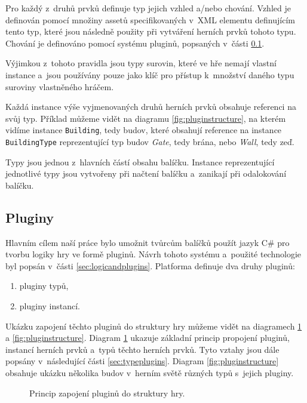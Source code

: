 Pro každý z~druhů prvků definuje typ jejich vzhled a/nebo chování. Vzhled je definován pomocí množiny assetů specifikovaných v~XML elementu definujícím tento typ, které jsou následně použity při vytváření herních prvků tohoto typu. Chování je definováno pomocí systému pluginů, popsaných v~části \ref{sec:plugins}. 

Výjimkou z~tohoto pravidla jsou typy surovin, které ve hře nemají vlastní instance a~jsou používány pouze jako klíč pro přístup k~množství daného typu suroviny vlastněného hráčem.

Každá instance výše vyjmenovaných druhů herních prvků obsahuje referenci na svůj typ. Příklad můžeme vidět na diagramu \ref{fig:pluginstructure}, na kterém vidíme instance \texttt{Building}, tedy budov, které obsahují reference na instance \texttt{BuildingType} reprezentující typ budov \textit{Gate}, tedy brána, nebo \textit{Wall}, tedy zeď.

Typy jsou jednou z~hlavních částí obsahu balíčku. Instance reprezentující jednotlivé typy jsou vytvořeny při načtení balíčku a~zanikají při odalokování balíčku. 

\subsection{Pluginy}
\label{sec:plugins}
Hlavním cílem naší práce bylo umožnit tvůrcům balíčků použít jazyk C\# pro tvorbu logiky hry ve formě pluginů. Návrh tohoto systému a~použité technologie byl popsán v~části \ref{sec:logicandplugins}. Platforma definuje dva druhy pluginů:

\begin{enumerate}
	\item pluginy typů,
	\item pluginy instancí.
\end{enumerate}

Ukázku zapojení těchto pluginů do struktury hry můžeme vidět na diagramech \ref{fig:simplepluginstructure} a \ref{fig:pluginstructure}. Diagram \ref{fig:simplepluginstructure} ukazuje základní princip propojení pluginů, instancí herních prvků a~typů těchto herních prvků. Tyto vztahy jsou dále popsány v~následující části \ref{sec:typeplugins}. Diagram \ref{fig:pluginstructure} obsahuje ukázku několika budov v~herním světě různých typů s~jejich pluginy.

\begin{figure}[h]
	\centering
	\fontsize{8pt}{11pt}\selectfont
	\def\svgwidth{\textwidth}
	
	\caption{Princip zapojení pluginů do struktury hry.}
	\label{fig:simplepluginstructure}
\end{figure}

